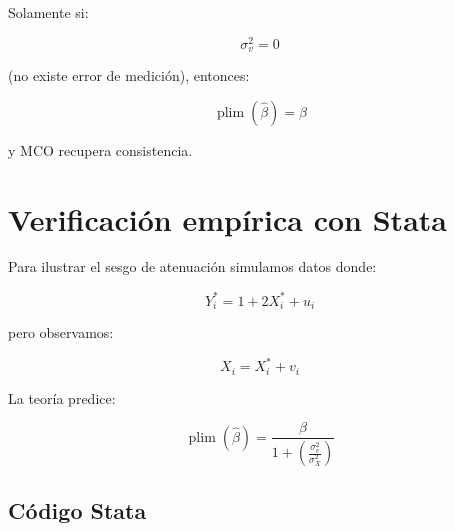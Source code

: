 \documentclass[12pt,letterpaper]{article}
\newcommand{\plim}{\operatorname{plim}}
\begin{document}
Solamente si:

\begin{equation}
\sigma_v^2=0
\end{equation}

(no existe error de medición), entonces:

\begin{equation}
\plim(\hat{\beta})=\beta
\end{equation}

y MCO recupera consistencia.

\section{Verificación empírica con Stata}

Para ilustrar el sesgo de atenuación simulamos datos donde:

\begin{equation}
Y_i^{*}=1+2X_i^{*}+u_i
\end{equation}

pero observamos:

\begin{equation}
X_i=X_i^{*}+v_i
\end{equation}

La teoría predice:

\begin{equation}
\plim(\hat{\beta})
=
\frac{\beta}
{1+\left(\frac{\sigma_v^2}{\sigma_X^2}\right)}
\end{equation}

\subsection{Código Stata}
\end{document}
